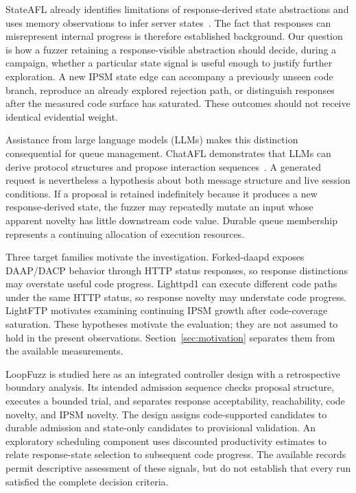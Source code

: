 \documentclass[final,5p,times,number]{elsarticle}
\begin{document}
StateAFL already identifies limitations of response-derived state abstractions and uses memory observations to infer server states~\cite{stateafl}. The fact that responses can misrepresent internal progress is therefore established background. Our question is how a fuzzer retaining a response-visible abstraction should decide, during a campaign, whether a particular state signal is useful enough to justify further exploration. A new IPSM state edge can accompany a previously unseen code branch, reproduce an already explored rejection path, or distinguish responses after the measured code surface has saturated. These outcomes should not receive identical evidential weight.

Assistance from large language models (LLMs) makes this distinction consequential for queue management. ChatAFL demonstrates that LLMs can derive protocol structures and propose interaction sequences~\cite{chatafl}. A generated request is nevertheless a hypothesis about both message structure and live session conditions. If a proposal is retained indefinitely because it produces a new response-derived state, the fuzzer may repeatedly mutate an input whose apparent novelty has little downstream code value. Durable queue membership represents a continuing allocation of execution resources.

Three target families motivate the investigation. Forked-daapd exposes DAAP/DACP behavior through HTTP status responses, so response distinctions may overstate useful code progress. Lighttpd1 can execute different code paths under the same HTTP status, so response novelty may understate code progress. LightFTP motivates examining continuing IPSM growth after code-coverage saturation. These hypotheses motivate the evaluation; they are not assumed to hold in the present observations. Section~\ref{sec:motivation} separates them from the available measurements.

LoopFuzz is studied here as an integrated controller design with a retrospective boundary analysis. Its intended admission sequence checks proposal structure, executes a bounded trial, and separates response acceptability, reachability, code novelty, and IPSM novelty. The design assigns code-supported candidates to durable admission and state-only candidates to provisional validation. An exploratory scheduling component uses discounted productivity estimates to relate response-state selection to subsequent code progress. The available records permit descriptive assessment of these signals, but do not establish that every run satisfied the complete decision criteria.
\end{document}
